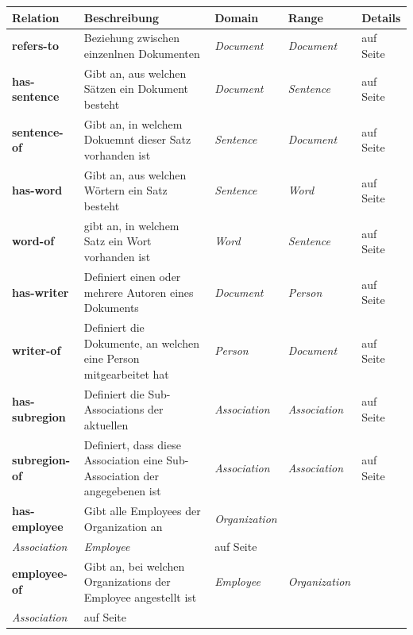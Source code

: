 ﻿\documentclass[
    11pt,
    latin1,
    a4paper,
    oneside
]{scrreprt}
\begin{document}
\begin{table}[h]
	\centering
	\begin{tabular}{ | l | p{5cm} | l | l| l | }
		\hline
		\textbf{Relation} & \textbf{Beschreibung} & \textbf{Domain} & \textbf{Range} & \textbf{Details} \\ \hline
		
		\textbf{refers-to} & Beziehung zwischen einzenlnen Dokumenten & \emph{Document} & \emph{Document} & \nameref{sec:rel_refersto} auf Seite \pageref{sec:rel_refersto} \\ \hline
		\textbf{has-sentence} & Gibt an, aus welchen S\"atzen ein Dokument besteht & \emph{Document} & \emph{Sentence} & \nameref{sec:rel_hassentence} auf Seite \pageref{sec:rel_hassentence} \\ \hline
		\textbf{sentence-of} & Gibt an, in welchem Dokuemnt dieser Satz vorhanden ist & \emph{Sentence} & \emph{Document} & \nameref{sec:rel_sentenceof} auf Seite \pageref{sec:rel_sentenceof} \\ \hline
		\textbf{has-word} & Gibt an, aus welchen W\"ortern ein Satz besteht & \emph{Sentence} & \emph{Word} & \nameref{sec:rel_hasword} auf Seite \pageref{sec:rel_hasword} \\ \hline
		\textbf{word-of} & gibt an, in welchem Satz ein Wort vorhanden ist & \emph{Word} & \emph{Sentence} & \nameref{sec:rel_wordof} auf Seite \pageref{sec:rel_wordof} \\ \hline
		
		\textbf{has-writer} & Definiert einen oder mehrere Autoren eines Dokuments & \emph{Document} & \emph{Person} & \nameref{sec:rel_haswriter} auf Seite \pageref{sec:rel_haswriter} \\ \hline
		\textbf{writer-of} & Definiert die Dokumente, an welchen eine Person mitgearbeitet hat & \emph{Person} & \emph{Document} & \nameref{sec:rel_writerof} auf Seite \pageref{sec:rel_writerof} \\ \hline
		
		\textbf{has-subregion} & Definiert die Sub-Associations der aktuellen & \emph{Association} & \emph{Association} & \nameref{sec:rel_hassubregion} auf Seite \pageref{sec:rel_hassubregion} \\ \hline
		\textbf{subregion-of} & Definiert, dass diese Association eine Sub-Association der angegebenen ist & \emph{Association} & \emph{Association} & \nameref{sec:rel_subregionof} auf Seite \pageref{sec:rel_subregionof} \\ \hline
		
		\textbf{has-employee} & Gibt alle Employees der Organization an & \emph{Organization} \\ \emph{Association} & \emph{Employee} & \nameref{sec:rel_hasemployee} auf Seite \pageref{sec:rel_hasemployee} \\ \hline
		\textbf{employee-of} & Gibt an, bei welchen Organizations der Employee angestellt ist & \emph{Employee} & \emph{Organization} \\ \emph{Association} & \nameref{sec:rel_employeeof} auf Seite \pageref{sec:rel_employeeof} \\ \hline
		

\end{tabular}
\end{table}
\end{document}
